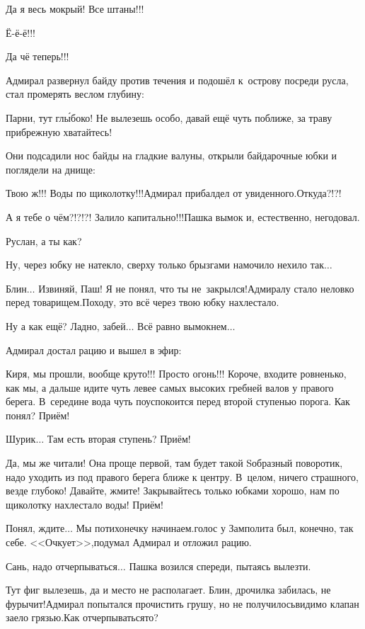 \diagdash Да я весь мокрый! Все штаны!!!

\diagdash Ё-ё-ё!!!

\diagdash Да чё теперь!!!

Адмирал развернул байду против течения и подошёл к~острову посреди русла, стал промерять веслом глубину:

\diagdash Парни, тут гл{\'ы}боко! Не вылезешь особо, давай ещё чуть поближе, за траву прибрежную хватайтесь!

Они подсадили нос байды на гладкие валуны, открыли байдарочные юбки и поглядели на днище:

\diagdash Твою ж!!! Воды по щиколотку!!!\mdash Адмирал прибалдел от увиденного.\mdash Откуда?!?!

\diagdash А я тебе о чём?!?!?! Залило капитально!!!\mdash Пашка вымок и, естественно, негодовал.
 
\diagdash Руслан, а ты как?

\diagdash Ну, через юбку не натекло, сверху только брызгами намочило нехило так$\ldots$

\diagdash Блин$\ldots$ Извиняй, Паш! Я не понял, что ты не~закрылся!\mdash Адмиралу стало неловко перед товарищем.\mdash Походу, это всё через твою юбку нахлестало.

\diagdash Ну а как ещё? Ладно, забей$\ldots$ Всё равно вымокнем$\ldots$

Адмирал достал рацию и вышел в эфир:

\diagdash Киря, мы прошли, вообще круто!!! Просто огонь!!! Короче, входите ровненько, как мы, а дальше идите чуть левее самых высоких гребней валов у правого берега. В~середине вода чуть поуспокоится перед второй ступенью порога. Как понял? Приём!

\diagdash Шурик$\ldots$ Там есть вторая ступень? Приём!

\diagdash Да, мы же читали! Она проще первой, там будет такой S\sdash образный поворотик, надо уходить из под правого берега ближе к центру. В~целом, ничего страшного, везде глубоко! Давайте, жмите! Закрывайтесь только юбками хорошо, нам по щиколотку нахлестало воды! Приём!

\diagdash Понял, ждите$\ldots$ Мы потихонечку начинаем.\mdash голос у Замполита был, конечно, так себе. <<Очкует>>,\mdash подумал Адмирал и отложил рацию.

\diagdash Сань, надо отчерпываться$\ldots$ \mdash Пашка возился спереди, пытаясь вылезти.

\diagdash Тут фиг вылезешь, да и место не располагает. Блин, дрочилка забилась, не фурычит!\mdash Адмирал попытался прочистить грушу, но не получилось\mdash видимо клапан заело грязью.\mdash Как отчерпываться\sdash то?

